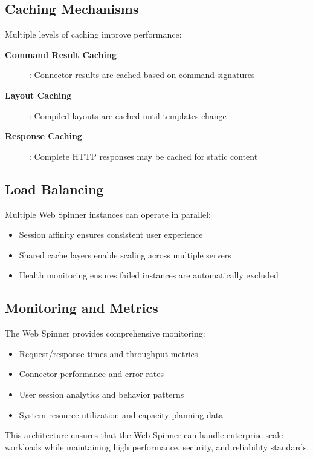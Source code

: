 \subsection{Caching Mechanisms}

Multiple levels of caching improve performance:

\begin{description}
	\item[\textbf{Command Result Caching}]: Connector results are cached based on command signatures
	\item[\textbf{Layout Caching}]: Compiled layouts are cached until templates change
	\item[\textbf{Response Caching}]: Complete HTTP responses may be cached for static content
\end{description}

\subsection{Load Balancing}

Multiple Web Spinner instances can operate in parallel:
\begin{itemize}
	\item Session affinity ensures consistent user experience
	\item Shared cache layers enable scaling across multiple servers
	\item Health monitoring ensures failed instances are automatically excluded
\end{itemize}

\subsection{Monitoring and Metrics}

The Web Spinner provides comprehensive monitoring:
\begin{itemize}
	\item Request/response times and throughput metrics
	\item Connector performance and error rates
	\item User session analytics and behavior patterns
	\item System resource utilization and capacity planning data
\end{itemize}

This architecture ensures that the Web Spinner can handle enterprise-scale workloads while maintaining high performance, security, and reliability standards.

